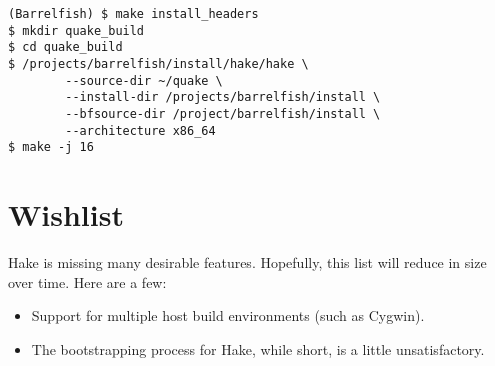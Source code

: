 \documentclass[a4paper,twoside]{report} %
\begin{document}
\begin{verbatim}
(Barrelfish) $ make install_headers
$ mkdir quake_build
$ cd quake_build
$ /projects/barrelfish/install/hake/hake \
        --source-dir ~/quake \
        --install-dir /projects/barrelfish/install \
        --bfsource-dir /project/barrelfish/install \
        --architecture x86_64
$ make -j 16
\end{verbatim}

\chapter{Wishlist}

Hake is missing many desirable features.  Hopefully, this list will
reduce in size over time.  Here are a few:

\begin{itemize}
\item Support for multiple host build environments (such as Cygwin).
\item The bootstrapping process for Hake, while short, is a little
  unsatisfactory.
\end{itemize}
\end{document}
